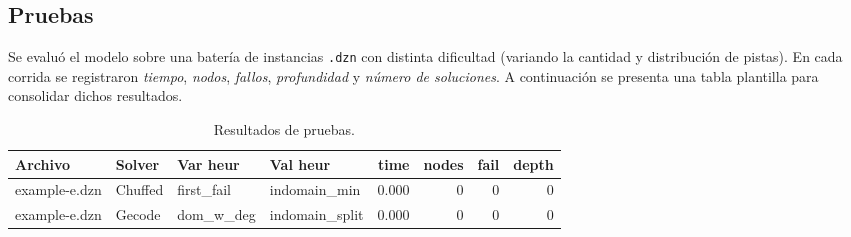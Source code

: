 
\subsection{Pruebas}\label{sec:pruebas}

Se evaluó el modelo sobre una batería de instancias \texttt{.dzn} con distinta dificultad (variando la cantidad y distribución de pistas). En cada corrida se registraron \emph{tiempo}, \emph{nodos}, \emph{fallos}, \emph{profundidad} y \emph{número de soluciones}. A continuación se presenta una tabla plantilla para consolidar dichos resultados.

\begin{table}[!htbp]
  \centering
  \small
  \setlength{\tabcolsep}{2.8pt}
  \caption{Resultados de pruebas.}
  \label{tab:pruebas-sudoku}
  \begin{tabular}{l l l l r r r r}
    \toprule
    \textbf{Archivo} & \textbf{Solver} & \textbf{Var heur} & \textbf{Val heur} & \textbf{time} & \textbf{nodes} & \textbf{fail} & \textbf{depth} \\
    \midrule
    example-e.dzn & Chuffed & first\_fail  & indomain\_min   & 0.000 & 0 & 0 & 0 \\
    example-e.dzn & Gecode  & dom\_w\_deg  & indomain\_split & 0.000 & 0 & 0 & 0 \\
    \bottomrule
  \end{tabular}
\end{table}

